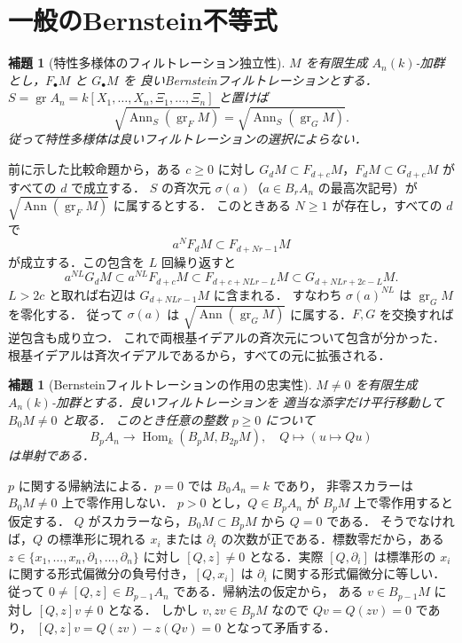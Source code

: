 \documentclass[a5paper,10pt,onecolumn]{jsarticle}
\makeatletter
\theoremstyle{mathnotetheorem}
\newtheorem{lemma}[theorem]{補題}
\renewcommand{\proofname}{証明}
\renewenvironment{proof}[1][\proofname]{%
  \par\pushQED{\qed}\normalfont\topsep4\p@\@plus2\p@\relax
  \trivlist\item[\hskip\labelsep\bfseries #1]\ignorespaces
}{\popQED\endtrivlist\@endpefalse}
\makeatother
\begin{document}
\section{一般のBernstein不等式}
\begin{lemma}[特性多様体のフィルトレーション独立性]
$M$ を有限生成 $A_n(k)$-加群とし，$F_\bullet M$ と $G_\bullet M$ を
良いBernsteinフィルトレーションとする．
$S=\operatorname{gr}A_n=k[X_1,\ldots,X_n,\Xi_1,\ldots,\Xi_n]$ と置けば
\[
 \sqrt{\operatorname{Ann}_S(\operatorname{gr}_F M)}
 =\sqrt{\operatorname{Ann}_S(\operatorname{gr}_G M)}.
\]
従って特性多様体は良いフィルトレーションの選択によらない．
\end{lemma}
\begin{proof}
前に示した比較命題から，ある $c\ge0$ に対し
$G_dM\subset F_{d+c}M$，$F_dM\subset G_{d+c}M$ がすべての $d$ で成立する．
$S$ の斉次元 $\sigma(a)$（$a\in B_rA_n$ の最高次記号）が
$\sqrt{\operatorname{Ann}(\operatorname{gr}_F M)}$ に属するとする．
このときある $N\ge1$ が存在し，すべての $d$ で
\[
 a^N F_dM\subset F_{d+Nr-1}M
\]
が成立する．この包含を $L$ 回繰り返すと
\[
 a^{NL}G_dM\subset a^{NL}F_{d+c}M
 \subset F_{d+c+NLr-L}M
 \subset G_{d+NLr+2c-L}M.
\]
$L>2c$ と取れば右辺は $G_{d+NLr-1}M$ に含まれる．
すなわち $\sigma(a)^{NL}$ は $\operatorname{gr}_G M$ を零化する．
従って $\sigma(a)$ は $\sqrt{\operatorname{Ann}(\operatorname{gr}_G M)}$
に属する．$F,G$ を交換すれば逆包含も成り立つ．
これで両根基イデアルの斉次元について包含が分かった．
根基イデアルは斉次イデアルであるから，すべての元に拡張される．
\end{proof}
\begin{lemma}[Bernsteinフィルトレーションの作用の忠実性]
$M\ne0$ を有限生成 $A_n(k)$-加群とする．良いフィルトレーションを
適当な添字だけ平行移動して $B_0M\ne0$ と取る．
このとき任意の整数 $p\ge0$ について
\[
 B_pA_n\longrightarrow
 \operatorname{Hom}_k(B_pM,B_{2p}M),\quad
 Q\longmapsto(u\mapsto Qu)
\]
は単射である．
\end{lemma}
\begin{proof}
$p$ に関する帰納法による．$p=0$ では $B_0A_n=k$ であり，
非零スカラーは $B_0M\ne0$ 上で零作用しない．
$p>0$ とし，$Q\in B_pA_n$ が $B_pM$ 上で零作用すると仮定する．
$Q$ がスカラーなら，$B_0M\subset B_pM$ から $Q=0$ である．
そうでなければ，$Q$ の標準形に現れる $x_i$ または
$\partial_i$ の次数が正である．標数零だから，ある
$z\in\{x_1,\ldots,x_n,\partial_1,\ldots,\partial_n\}$ に対し
$[Q,z]\ne0$ となる．実際 $[Q,\partial_i]$ は標準形の
$x_i$ に関する形式偏微分の負号付き，$[Q,x_i]$ は
$\partial_i$ に関する形式偏微分に等しい．
従って $0\ne[Q,z]\in B_{p-1}A_n$ である．帰納法の仮定から，
ある $v\in B_{p-1}M$ に対し $[Q,z]v\ne0$ となる．
しかし $v,zv\in B_pM$ なので
$Qv=Q(zv)=0$ であり，
$[Q,z]v=Q(zv)-z(Qv)=0$ となって矛盾する．
\end{proof}
\end{document}

